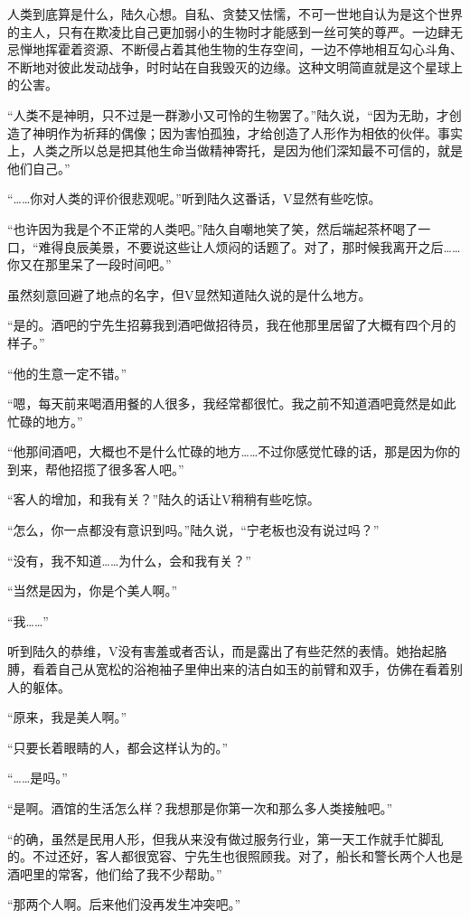 人类到底算是什么，陆久心想。自私、贪婪又怯懦，不可一世地自认为是这个世界的主人，只有在欺凌比自己更加弱小的生物时才能感到一丝可笑的尊严。一边肆无忌惮地挥霍着资源、不断侵占着其他生物的生存空间，一边不停地相互勾心斗角、不断地对彼此发动战争，时时站在自我毁灭的边缘。这种文明简直就是这个星球上的公害。

“人类不是神明，只不过是一群渺小又可怜的生物罢了。”陆久说，“因为无助，才创造了神明作为祈拜的偶像；因为害怕孤独，才给创造了人形作为相依的伙伴。事实上，人类之所以总是把其他生命当做精神寄托，是因为他们深知最不可信的，就是他们自己。”

“……你对人类的评价很悲观呢。”听到陆久这番话，V显然有些吃惊。

“也许因为我是个不正常的人类吧。”陆久自嘲地笑了笑，然后端起茶杯喝了一口，“难得良辰美景，不要说这些让人烦闷的话题了。对了，那时候我离开之后……你又在那里呆了一段时间吧。” 

虽然刻意回避了地点的名字，但V显然知道陆久说的是什么地方。

“是的。酒吧的宁先生招募我到酒吧做招待员，我在他那里居留了大概有四个月的样子。”

“他的生意一定不错。”

“嗯，每天前来喝酒用餐的人很多，我经常都很忙。我之前不知道酒吧竟然是如此忙碌的地方。”

“他那间酒吧，大概也不是什么忙碌的地方……不过你感觉忙碌的话，那是因为你的到来，帮他招揽了很多客人吧。”

“客人的增加，和我有关？”陆久的话让V稍稍有些吃惊。

“怎么，你一点都没有意识到吗。”陆久说，“宁老板也没有说过吗？”

“没有，我不知道……为什么，会和我有关？”

“当然是因为，你是个美人啊。”

“我……”

听到陆久的恭维，V没有害羞或者否认，而是露出了有些茫然的表情。她抬起胳膊，看着自己从宽松的浴袍袖子里伸出来的洁白如玉的前臂和双手，仿佛在看着别人的躯体。

“原来，我是美人啊。”

“只要长着眼睛的人，都会这样认为的。”

“……是吗。”

“是啊。酒馆的生活怎么样？我想那是你第一次和那么多人类接触吧。”

“的确，虽然是民用人形，但我从来没有做过服务行业，第一天工作就手忙脚乱的。不过还好，客人都很宽容、宁先生也很照顾我。对了，船长和警长两个人也是酒吧里的常客，他们给了我不少帮助。”

“那两个人啊。后来他们没再发生冲突吧。”

